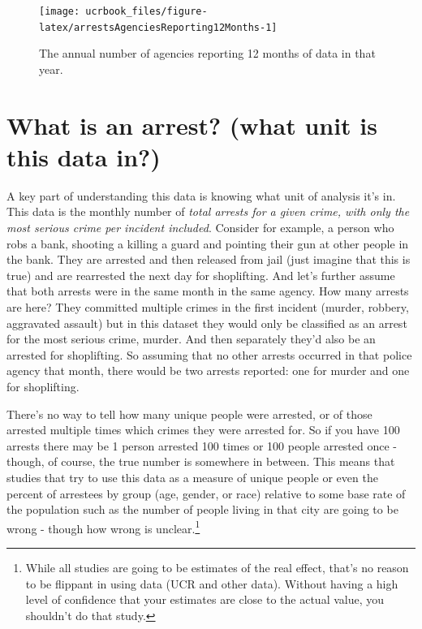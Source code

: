 \documentclass[
  12pt,
  openany]{book}
\begin{document}
\begin{figure}

{\centering \texttt{[image: ucrbook\_files/figure-latex/arrestsAgenciesReporting12Months-1]} 

}

\caption{The annual number of agencies reporting 12 months of data in that year.}\label{fig:arrestsAgenciesReporting12Months}
\end{figure}

\hypertarget{what-is-an-arrest-what-unit-is-this-data-in}{%
\section{What is an arrest? (what unit is this data in?)}\label{what-is-an-arrest-what-unit-is-this-data-in}}

A key part of understanding this data is knowing what unit of analysis it's in. This data is the monthly number of \emph{total arrests for a given crime, with only the most serious crime per incident included}. Consider for example, a person who robs a bank, shooting a killing a guard and pointing their gun at other people in the bank. They are arrested and then released from jail (just imagine that this is true) and are rearrested the next day for shoplifting. And let's further assume that both arrests were in the same month in the same agency. How many arrests are here? They committed multiple crimes in the first incident (murder, robbery, aggravated assault) but in this dataset they would only be classified as an arrest for the most serious crime, murder. And then separately they'd also be an arrested for shoplifting. So assuming that no other arrests occurred in that police agency that month, there would be two arrests reported: one for murder and one for shoplifting.

There's no way to tell how many unique people were arrested, or of those arrested multiple times which crimes they were arrested for. So if you have 100 arrests there may be 1 person arrested 100 times or 100 people arrested once - though, of course, the true number is somewhere in between. This means that studies that try to use this data as a measure of unique people or even the percent of arrestees by group (age, gender, or race) relative to some base rate of the population such as the number of people living in that city are going to be wrong - though how wrong is unclear.\footnote{While all studies are going to be estimates of the real effect, that's no reason to be flippant in using data (UCR and other data). Without having a high level of confidence that your estimates are close to the actual value, you shouldn't do that study.}
\end{document}
